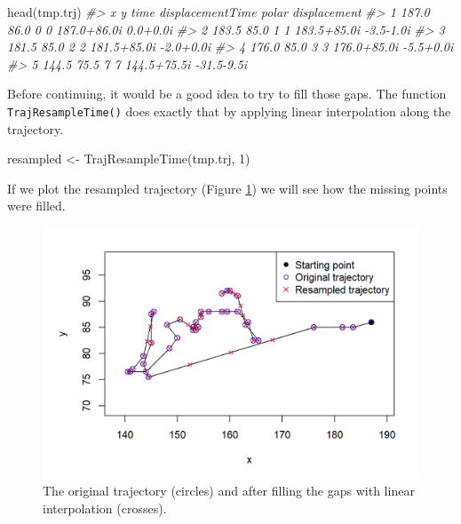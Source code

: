 \documentclass[
  11pt,
]{krantz}
\newenvironment{Shaded}{\begin{snugshade}}{\end{snugshade}}
\newcommand{\CommentTok}[1]{\textcolor[rgb]{0.37,0.37,0.37}{\textit{#1}}}
\newcommand{\DecValTok}[1]{\textcolor[rgb]{0.06,0.06,0.06}{#1}}
\newcommand{\FunctionTok}[1]{\textcolor[rgb]{0,0,0}{#1}}
\newcommand{\NormalTok}[1]{#1}
\newcommand{\OtherTok}[1]{\textcolor[rgb]{0.37,0.37,0.37}{#1}}
\begin{document}
\begin{Shaded}
\begin{Highlighting}[]
\FunctionTok{head}\NormalTok{(tmp.trj)}
\CommentTok{\#\textgreater{}        x    y time displacementTime       polar displacement}
\CommentTok{\#\textgreater{} 1  187.0 86.0    0                0 187.0+86.0i     0.0+0.0i}
\CommentTok{\#\textgreater{} 2  183.5 85.0    1                1 183.5+85.0i    {-}3.5{-}1.0i}
\CommentTok{\#\textgreater{} 3  181.5 85.0    2                2 181.5+85.0i    {-}2.0+0.0i}
\CommentTok{\#\textgreater{} 4  176.0 85.0    3                3 176.0+85.0i    {-}5.5+0.0i}
\CommentTok{\#\textgreater{} 5  144.5 75.5    7                7 144.5+75.5i   {-}31.5{-}9.5i}
\end{Highlighting}
\end{Shaded}

Before continuing, it would be a good idea to try to fill those gaps. The function \texttt{TrajResampleTime()} does exactly that by applying linear interpolation along the trajectory.

\begin{Shaded}
\begin{Highlighting}[]
\NormalTok{resampled }\OtherTok{\textless{}{-}} \FunctionTok{TrajResampleTime}\NormalTok{(tmp.trj, }\DecValTok{1}\NormalTok{)}
\end{Highlighting}
\end{Shaded}

If we plot the resampled trajectory (Figure \ref{fig:trajResampledPlot}) we will see how the missing points were filled.

\begin{figure}

{\centering \includegraphics[width=1\linewidth]{images/traj_resampled_plot} 

}

\caption{The original trajectory (circles) and after filling the gaps with linear interpolation (crosses).}\label{fig:trajResampledPlot}
\end{figure}
\end{document}
